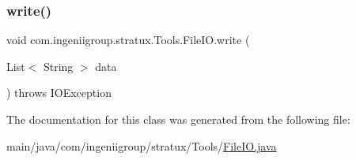 \subsubsection{\texorpdfstring{write()}{write()}\hspace{0.1cm}{\footnotesize\ttfamily [2/2]}}
{\footnotesize\ttfamily void com.\+ingeniigroup.\+stratux.\+Tools.\+File\+I\+O.\+write (\begin{DoxyParamCaption}\item[{List$<$ String $>$}]{data }\end{DoxyParamCaption}) throws I\+O\+Exception}



The documentation for this class was generated from the following file\+:\begin{DoxyCompactItemize}
\item 
main/java/com/ingeniigroup/stratux/\+Tools/\hyperlink{_file_i_o_8java}{File\+I\+O.\+java}\end{DoxyCompactItemize}
